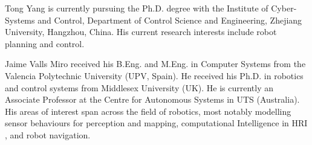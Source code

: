 \documentclass[journal]{IEEEtran}
\begin{document}
% 

\vspace*{-5mm}

\begin{IEEEbiography}{Tong Yang} 
is currently pursuing the Ph.D. degree with the Institute of Cyber-Systems and Control, Department of Control Science and Engineering, Zhejiang University, Hangzhou, China. His current research interests include robot planning and control.
\end{IEEEbiography}

\vspace*{-5mm}

\begin{IEEEbiography}
{Jaime Valls Miro} received his B.Eng. and M.Eng. in Computer Systems from the Valencia Polytechnic University (UPV, Spain). He received his Ph.D. in robotics and control systems from Middlesex University (UK). He is currently an Associate Professor at the Centre for Autonomous Systems in UTS (Australia). His areas of interest span across the field of robotics, most notably modelling sensor behaviours for perception and mapping, computational Intelligence in HRI , and robot navigation. 
\end{IEEEbiography}
\end{document}
